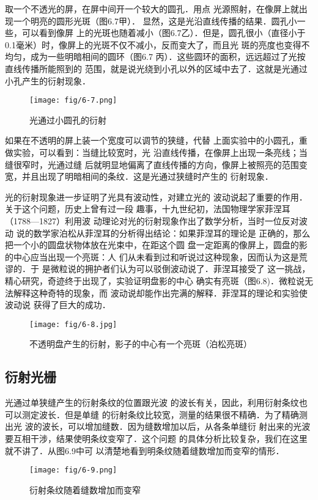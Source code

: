 取一个不透光的屏，在屏中间开一个较大的圆孔．用点
光源照射，在像屏上就出现一个明亮的圆形光斑（图6.7甲）．
显然，这是光沿直线传播的结果．圆孔小一些，可以看到像屏
上的光斑也随着减小（图6.7乙）．但是，圆孔很小（直径小于
0.1毫米）时，像屏上的光斑不仅不减小，反而变大了，而且光
斑的亮度也变得不均匀，成为一些明暗相间的圆环（图6.7
丙）．这些圆环的面积，远远超过了光按直线传播所能照到的
范围，就是说光绕到小孔以外的区域中去了．这就是光通过
小孔产生的衍射现象．
\begin{figure}[htp]\centering
    \texttt{[image: fig/6-7.png]}
    \caption{光通过小圆孔的衍射}
    \end{figure}

如果在不透明的屏上装一个宽度可以调节的狭缝，代替
上面实验中的小圆孔，重做实验，可以看到：当缝比较宽时，光
沿直线传播，在像屏上出现一条亮线；当缝很窄时，光通过缝
后就明显地偏离了直线传播的方向，像屏上被照亮的范围变
宽，并且出现了明暗相间的条纹．这是光通过狭缝时产生的
衍射现象．

光的衍射现象进一步证明了光具有波动性，对建立光的
波动说起了重要的作用．关于这个问题，历史上曾有过一段
趣事，十九世纪初，法国物理学家菲涅耳（1788—1827）利用波
动理论对光的衍射现象作出了数学分析，当时一位反对波动
说的数学家泊松从菲涅耳的分析得出结论：如果菲涅耳的理论是
正确的，那么把一个小的圆盘状物体放在光束中，在距这个圆
盘一定距离的像屏上，圆盘的影的中心应当出现一个亮斑：人
们从未看到过和听说过这种现象，因而认为这是荒谬的．于
是微粒说的拥护者们认为可以驳倒波动说了．菲涅耳接受了
这一挑战，精心研究，奇迹终于出现了，实验证明盘影的中心
确实有亮斑（图6.8)．微粒说无法解释这种奇特的现象，而
波动说却能作出完满的解释．菲涅耳的理论和实验使波动说
获得了巨大的成功．

\begin{figure}[htp]\centering
\texttt{[image: fig/6-8.jpg]}
\caption{不透明盘产生的衍射，影子的中心有一个亮斑（泊松亮斑）}
\end{figure}

\subsection{衍射光栅}

光通过单狭缝产生的衍射条纹的位置跟光波
的波长有关，因此，利用衍射条纹也可以测定波长．但是单缝
的衍射条纹比较宽，测量的结果很不精确．为了精确测出光
波的波长，可以增加缝数．因为缝数增加以后，从各条单缝衍
射出来的光波要互相干涉，结果使明条纹变窄了．这个问题
的具体分析比较复杂，我们在这里就不讲了．从图6.9中可
以清楚地看到明条纹随着缝数增加而变窄的情形．
\begin{figure}[htp]\centering
    \texttt{[image: fig/6-9.png]}
    \caption{衍射条纹随着缝数增加而变窄}
    \end{figure}

